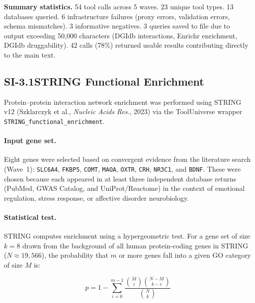 \noindent
\textbf{Summary statistics.}
54 tool calls across 5 waves.  23 unique tool types.  13 databases queried.
6 infrastructure failures (proxy errors, validation errors, schema mismatches).
3 informative negatives.  3 queries saved to file due to output exceeding
50{,}000 characters (DGIdb interactions, Enrichr enrichment, DGIdb
druggability).  42 calls (78\%) returned usable results contributing
directly to the main text.



\subsection*{SI-3.1\quad STRING Functional Enrichment}

Protein--protein interaction network enrichment was performed using STRING
v12 (Szklarczyk et al., \textit{Nucleic Acids Res.}, 2023) via the ToolUniverse wrapper
\texttt{STRING\_functional\_enrichment}.

\paragraph{Input gene set.}
Eight genes were selected based on convergent evidence from the literature
search (Wave~1): \texttt{SLC6A4}, \texttt{FKBP5}, \texttt{COMT},
\texttt{MAOA}, \texttt{OXTR}, \texttt{CRH}, \texttt{NR3C1}, and
\texttt{BDNF}.  These were chosen because each appeared in at least three
independent database returns (PubMed, GWAS Catalog, and UniProt/Reactome)
in the context of emotional regulation, stress response, or affective
disorder neurobiology.

\paragraph{Statistical test.}
STRING computes enrichment using a hypergeometric test.  For a gene set of
size $k = 8$ drawn from the background of all human protein-coding genes
in STRING ($N \approx 19{,}566$), the probability that $m$ or more genes
fall into a given GO category of size $M$ is:

\begin{equation}
  p = 1 - \sum_{i=0}^{m-1} \frac{\binom{M}{i}\binom{N-M}{k-i}}{\binom{N}{k}}
\end{equation}

